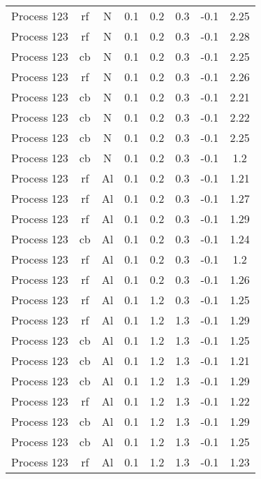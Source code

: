 \documentclass[a4paper,12pt,twoside]{article}
\begin{document}
\begin{ThreePartTable}
\begin{longtable}[c]{ l c c c c c c c }
		Process 123                & rf   & N  & 0.1 & 0.2 & 0.3 & -0.1 & 2.25 \\
		Process 123                & rf   & N  & 0.1 & 0.2 & 0.3 & -0.1 & 2.28 \\
		Process 123                & cb   & N  & 0.1 & 0.2 & 0.3 & -0.1 & 2.25 \\
		Process 123                & rf   & N  & 0.1 & 0.2 & 0.3 & -0.1 & 2.26 \\
		Process 123                & cb   & N  & 0.1 & 0.2 & 0.3 & -0.1 & 2.21 \\
		Process 123                & cb   & N  & 0.1 & 0.2 & 0.3 & -0.1 & 2.22 \\
		Process 123                & cb   & N  & 0.1 & 0.2 & 0.3 & -0.1 & 2.25 \\
		Process 123                & cb   & N  & 0.1 & 0.2 & 0.3 & -0.1 & 1.2  \\
		Process 123                & rf   & Al & 0.1 & 0.2 & 0.3 & -0.1 & 1.21 \\
		Process 123                & rf   & Al & 0.1 & 0.2 & 0.3 & -0.1 & 1.27 \\
		Process 123                & rf   & Al & 0.1 & 0.2 & 0.3 & -0.1 & 1.29 \\
		Process 123                & cb   & Al & 0.1 & 0.2 & 0.3 & -0.1 & 1.24 \\
		Process 123                & rf   & Al & 0.1 & 0.2 & 0.3 & -0.1 & 1.2  \\
		Process 123                & rf   & Al & 0.1 & 0.2 & 0.3 & -0.1 & 1.26 \\
		Process 123                & rf   & Al & 0.1 & 1.2 & 0.3 & -0.1 & 1.25 \\
		Process 123                & rf   & Al & 0.1 & 1.2 & 1.3 & -0.1 & 1.29 \\
		Process 123                & cb   & Al & 0.1 & 1.2 & 1.3 & -0.1 & 1.25 \\
		Process 123                & cb   & Al & 0.1 & 1.2 & 1.3 & -0.1 & 1.21 \\
		Process 123                & cb   & Al & 0.1 & 1.2 & 1.3 & -0.1 & 1.29 \\
		Process 123                & rf   & Al & 0.1 & 1.2 & 1.3 & -0.1 & 1.22 \\
		Process 123                & cb   & Al & 0.1 & 1.2 & 1.3 & -0.1 & 1.29 \\
		Process 123                & cb   & Al & 0.1 & 1.2 & 1.3 & -0.1 & 1.25 \\
		Process 123                & rf   & Al & 0.1 & 1.2 & 1.3 & -0.1 & 1.23 \\

\end{longtable}
\end{ThreePartTable}
\end{document}
